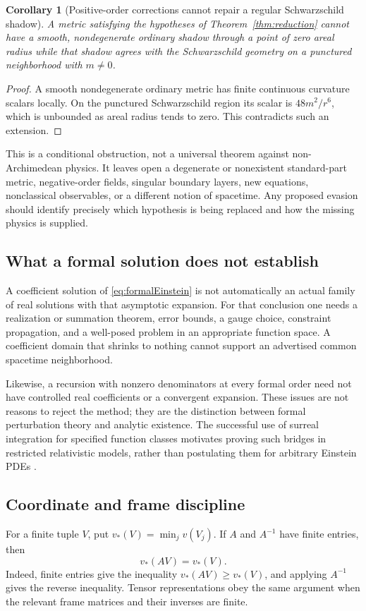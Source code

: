 \documentclass[11pt,a4paper]{article}
\numberwithin{equation}{section}
\newtheorem{corollary}[theorem]{Corollary}
\theoremstyle{definition}
\theoremstyle{remark}
\begin{document}
\begin{corollary}[Positive-order corrections cannot repair a regular Schwarzschild shadow]\label{cor:shadow}
A metric satisfying the hypotheses of Theorem~\ref{thm:reduction} cannot have a smooth, nondegenerate ordinary shadow through a point of zero areal radius while that shadow agrees with the Schwarzschild geometry on a punctured neighborhood with $m\ne0$.
\end{corollary}
\begin{proof}
A smooth nondegenerate ordinary metric has finite continuous curvature scalars locally. On the punctured Schwarzschild region its scalar is $48m^2/r^6$, which is unbounded as areal radius tends to zero. This contradicts such an extension.
\end{proof}

This is a conditional obstruction, not a universal theorem against non-Archimedean physics. It leaves open a degenerate or nonexistent standard-part metric, negative-order fields, singular boundary layers, new equations, nonclassical observables, or a different notion of spacetime. Any proposed evasion should identify precisely which hypothesis is being replaced and how the missing physics is supplied.

\subsection{What a formal solution does not establish}
A coefficient solution of \eqref{eq:formalEinstein} is not automatically an actual family of real solutions with that asymptotic expansion. For that conclusion one needs a realization or summation theorem, error bounds, a gauge choice, constraint propagation, and a well-posed problem in an appropriate function space. A coefficient domain that shrinks to nothing cannot support an advertised common spacetime neighborhood.

Likewise, a recursion with nonzero denominators at every formal order need not have controlled real coefficients or a convergent expansion. These issues are not reasons to reject the method; they are the distinction between formal perturbation theory and analytic existence. The successful use of surreal integration for specified function classes motivates proving such bridges in restricted relativistic models, rather than postulating them for arbitrary Einstein PDEs \cite{CE}.

\subsection{Coordinate and frame discipline}
For a finite tuple $V$, put $v_*(V)=\min_j v(V_j)$. If $A$ and $A^{-1}$ have finite entries, then
\begin{equation}\label{eq:framevaluation}
 v_*(AV)=v_*(V).
\end{equation}
Indeed, finite entries give the inequality $v_*(AV)\geq v_*(V)$, and applying $A^{-1}$ gives the reverse inequality. Tensor representations obey the same argument when the relevant frame matrices and their inverses are finite.
\end{document}
